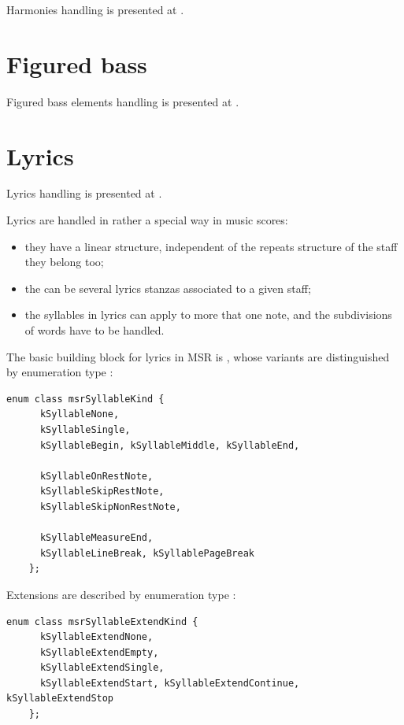 Harmonies handling is presented at .


\section{Figured bass}\label{Figured bass}

Figured bass elements handling is presented at .


\section{Lyrics}\label{Lyrics}

Lyrics handling is presented at .

Lyrics are handled in rather a special way in music scores:
\begin{itemize}
\item they have a linear structure, independent of the repeats structure of the staff they belong too;
\item the can be several lyrics stanzas associated to a given staff;
\item the syllables in lyrics can apply to more that one note, and the subdivisions of words have to be handled.
\end{itemize}

The basic building block for lyrics in MSR is , whose variants are distinguished by enumeration type :
\begin{lstlisting}[language=CPlusPlus]
    enum class msrSyllableKind {
      kSyllableNone,
      kSyllableSingle,
      kSyllableBegin, kSyllableMiddle, kSyllableEnd,

      kSyllableOnRestNote,
      kSyllableSkipRestNote,
      kSyllableSkipNonRestNote,

      kSyllableMeasureEnd,
      kSyllableLineBreak, kSyllablePageBreak
    };
\end{lstlisting}

Extensions are described by enumeration type {\tt }:
\begin{lstlisting}[language=CPlusPlus]
    enum class msrSyllableExtendKind {
      kSyllableExtendNone,
      kSyllableExtendEmpty,
      kSyllableExtendSingle,
      kSyllableExtendStart, kSyllableExtendContinue, kSyllableExtendStop
    };
\end{lstlisting}


